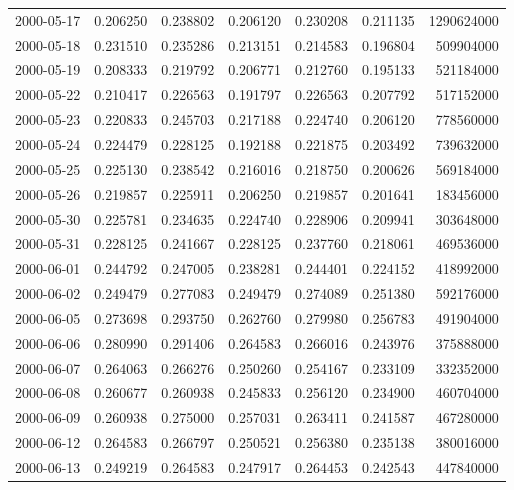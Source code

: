 \begin{tabular}{lrrrrrr}
2000-05-17 &    0.206250 &    0.238802 &    0.206120 &    0.230208 &    0.211135 &  1290624000 \\
2000-05-18 &    0.231510 &    0.235286 &    0.213151 &    0.214583 &    0.196804 &   509904000 \\
2000-05-19 &    0.208333 &    0.219792 &    0.206771 &    0.212760 &    0.195133 &   521184000 \\
2000-05-22 &    0.210417 &    0.226563 &    0.191797 &    0.226563 &    0.207792 &   517152000 \\
2000-05-23 &    0.220833 &    0.245703 &    0.217188 &    0.224740 &    0.206120 &   778560000 \\
2000-05-24 &    0.224479 &    0.228125 &    0.192188 &    0.221875 &    0.203492 &   739632000 \\
2000-05-25 &    0.225130 &    0.238542 &    0.216016 &    0.218750 &    0.200626 &   569184000 \\
2000-05-26 &    0.219857 &    0.225911 &    0.206250 &    0.219857 &    0.201641 &   183456000 \\
2000-05-30 &    0.225781 &    0.234635 &    0.224740 &    0.228906 &    0.209941 &   303648000 \\
2000-05-31 &    0.228125 &    0.241667 &    0.228125 &    0.237760 &    0.218061 &   469536000 \\
2000-06-01 &    0.244792 &    0.247005 &    0.238281 &    0.244401 &    0.224152 &   418992000 \\
2000-06-02 &    0.249479 &    0.277083 &    0.249479 &    0.274089 &    0.251380 &   592176000 \\
2000-06-05 &    0.273698 &    0.293750 &    0.262760 &    0.279980 &    0.256783 &   491904000 \\
2000-06-06 &    0.280990 &    0.291406 &    0.264583 &    0.266016 &    0.243976 &   375888000 \\
2000-06-07 &    0.264063 &    0.266276 &    0.250260 &    0.254167 &    0.233109 &   332352000 \\
2000-06-08 &    0.260677 &    0.260938 &    0.245833 &    0.256120 &    0.234900 &   460704000 \\
2000-06-09 &    0.260938 &    0.275000 &    0.257031 &    0.263411 &    0.241587 &   467280000 \\
2000-06-12 &    0.264583 &    0.266797 &    0.250521 &    0.256380 &    0.235138 &   380016000 \\
2000-06-13 &    0.249219 &    0.264583 &    0.247917 &    0.264453 &    0.242543 &   447840000 \\

\end{tabular}
